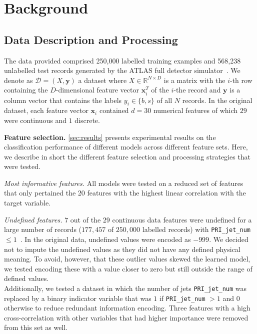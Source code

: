 \documentclass[10pt,conference,compsocconf]{IEEEtran}
\newcommand{\parabf}[1]{\vspace{1mm}\noindent\textbf{#1}}
\newcommand{\parait}[1]{\vspace{1mm}\noindent\textit{#1}}
\newcommand{\Data}{\mathcal{D}}
\newcommand{\features}{\mathbf{x}_i}
\newcommand{\target}{y_i}
\newcommand{\targetset}{\{ b, s \}}
\newcommand{\targetvector}{\mathbf{y}}
\begin{document}
\section{Background}

\subsection{Data Description and Processing}
\label{sec:data}
The data provided comprised 250,000 labelled training examples and 568,238 unlabelled test records generated by the ATLAS full detector simulator~\cite{HiggsML}.
We denote as $\Data = (X, \targetvector)$ a dataset where $X \in \mathbb{R}^{N \times D}$ is a matrix with the $i$-th row containing the $D$-dimensional feature vector $\features^T$ of the $i$-the record and $\targetvector$ is a column vector that contains the labels $\target \in \targetset$ of all $N$ records.       
In the original dataset, each feature vector $\features$ contained $d=30$ numerical features of which $29$ were continuous and $1$ discrete.  

\parabf{Feature selection.} \autoref{sec:results} presents experimental results on the classification performance of different models across different feature sets. Here, we describe in short the different feature selection and processing strategies that were tested.

\parait{Most informative features.} All models were tested on a reduced set of features that only pertained the 20 features with the highest linear correlation with the target variable.

\parait{Undefined features.} $7$ out of the $29$ continuous data features were undefined for a large number of records ($177,457$ of $250,000$ labelled records) with \texttt{PRI\_jet\_num} $\leq 1$~\cite{OpenDataCERN}. In the original data, undefined values were encoded as $-999$. We decided not to impute the undefined values as they did not have any defined physical meaning. To avoid, however, that these outlier values skewed the learned model, we tested encoding these with a value closer to zero but still outside the range of defined values.\\
Additionally, we tested a dataset in which the number of jets \texttt{PRI\_jet\_num} was replaced by a binary indicator variable that was $1$ if \texttt{PRI\_jet\_num} $>1$ and $0$ otherwise to reduce redundant information encoding. Three features with a high cross-correlation with other variables that had higher importance were removed from this set as well.
\end{document}
